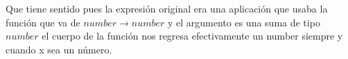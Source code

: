 Que tiene sentido pues la expresión original era una aplicación que usaba la función que va de $number \rightarrow number$ y el argumento es una suma de tipo $number$ el cuerpo de la función nos regresa efectivamente un number siempre y cuando x sea un número. \vspace{0.3cm}